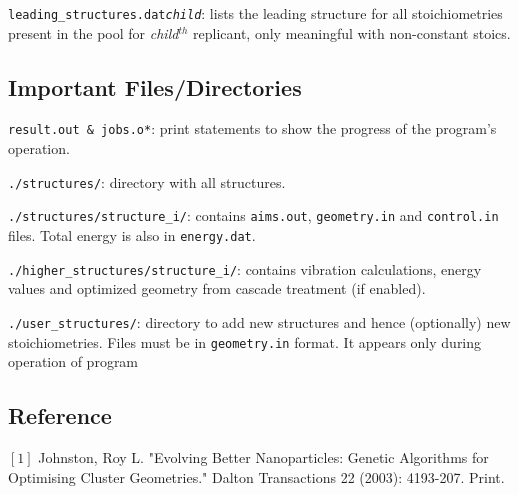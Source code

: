 \texttt{leading\_structures.dat{\em child}}: lists the leading structure for all stoichiometries present in the pool for {\em child}$^{th}$ replicant, only meaningful with non-constant stoics.\\

\subsection{Important Files/Directories}

\texttt{result.out \& jobs.o*}: print statements to show the progress of the program's operation.

\texttt{./structures/}: directory with all structures.

\texttt{./structures/structure\_i/}: contains \texttt{aims.out}, \texttt{geometry.in} and \texttt{control.in} files. Total energy is also in \texttt{energy.dat}.

\texttt{./higher\_structures/structure\_i/}: contains vibration calculations, energy values and optimized geometry from cascade treatment (if enabled).

\texttt{./user\_structures/}: directory to add new structures and hence (optionally) new stoichiometries. Files must be in \texttt{geometry.in} format. It appears only during operation of program

\subsection{Reference}

$[1]$ Johnston, Roy L. "Evolving Better Nanoparticles: Genetic Algorithms for Optimising Cluster Geometries." Dalton Transactions 22 (2003): 4193-207. Print.
 
